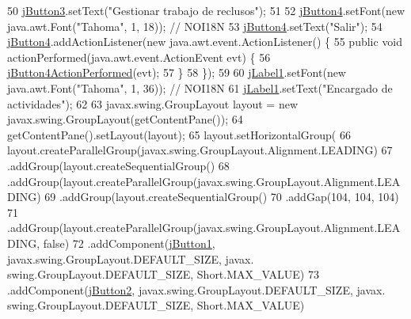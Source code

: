 \begin{DoxyCode}
50         \mbox{\hyperlink{classinterfacessoguar_1_1encargado_a44f99cceb2a2d736508b0249e1ad447e}{jButton3}}.setText(\textcolor{stringliteral}{"Gestionar trabajo de reclusos"});
51 
52         \mbox{\hyperlink{classinterfacessoguar_1_1encargado_ada21ea49d21b7b6bdd43b2a7c584450d}{jButton4}}.setFont(\textcolor{keyword}{new} java.awt.Font(\textcolor{stringliteral}{"Tahoma"}, 1, 18)); \textcolor{comment}{// NOI18N}
53         \mbox{\hyperlink{classinterfacessoguar_1_1encargado_ada21ea49d21b7b6bdd43b2a7c584450d}{jButton4}}.setText(\textcolor{stringliteral}{"Salir"});
54         \mbox{\hyperlink{classinterfacessoguar_1_1encargado_ada21ea49d21b7b6bdd43b2a7c584450d}{jButton4}}.addActionListener(\textcolor{keyword}{new} java.awt.event.ActionListener() \{
55             \textcolor{keyword}{public} \textcolor{keywordtype}{void} actionPerformed(java.awt.event.ActionEvent evt) \{
56                 \mbox{\hyperlink{classinterfacessoguar_1_1encargado_a60322c297cc3f0d5c9cbc4ca4b896712}{jButton4ActionPerformed}}(evt);
57             \}
58         \});
59 
60         \mbox{\hyperlink{classinterfacessoguar_1_1encargado_a1b1ad6a8d2b52a465c2daf3b4409c9ed}{jLabel1}}.setFont(\textcolor{keyword}{new} java.awt.Font(\textcolor{stringliteral}{"Tahoma"}, 1, 36)); \textcolor{comment}{// NOI18N}
61         \mbox{\hyperlink{classinterfacessoguar_1_1encargado_a1b1ad6a8d2b52a465c2daf3b4409c9ed}{jLabel1}}.setText(\textcolor{stringliteral}{"Encargado de actividades"});
62 
63         javax.swing.GroupLayout layout = \textcolor{keyword}{new} javax.swing.GroupLayout(getContentPane());
64         getContentPane().setLayout(layout);
65         layout.setHorizontalGroup(
66             layout.createParallelGroup(javax.swing.GroupLayout.Alignment.LEADING)
67             .addGroup(layout.createSequentialGroup()
68                 .addGroup(layout.createParallelGroup(javax.swing.GroupLayout.Alignment.LEADING)
69                     .addGroup(layout.createSequentialGroup()
70                         .addGap(104, 104, 104)
71                         .addGroup(layout.createParallelGroup(javax.swing.GroupLayout.Alignment.LEADING, \textcolor{keyword}{
      false})
72                             .addComponent(\mbox{\hyperlink{classinterfacessoguar_1_1encargado_a5c4a8d1db3281eae3c5b8f19262b20c3}{jButton1}}, javax.swing.GroupLayout.DEFAULT\_SIZE, javax.
      swing.GroupLayout.DEFAULT\_SIZE, Short.MAX\_VALUE)
73                             .addComponent(\mbox{\hyperlink{classinterfacessoguar_1_1encargado_a1f39888fb096cb2dd2e874f7e05f05b5}{jButton2}}, javax.swing.GroupLayout.DEFAULT\_SIZE, javax.
      swing.GroupLayout.DEFAULT\_SIZE, Short.MAX\_VALUE)

\end{DoxyCode}

